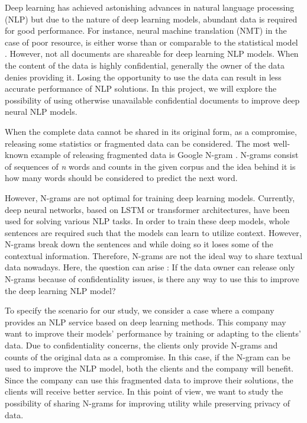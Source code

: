 

Deep learning has achieved astonishing advances in natural language processing (NLP) but due to the nature of deep learning models, abundant data is required for good performance. For instance, neural machine translation (NMT) in the case of poor resource, is either worse than or comparable to the statistical model \parencite{zoph2016transfer}. However, not all documents are shareable for deep learning NLP models. When the content of the data is highly confidential, generally the owner of the data denies providing it. Losing the opportunity to use the data can result in less accurate performance of NLP solutions. In this project, we will explore the possibility of using otherwise unavailable confidential documents to improve deep neural NLP models.

When the complete data cannot be shared in its original form, as a compromise, releasing some statistics or fragmented data can be considered. The most well-known example of releasing fragmented data is Google N-gram \parencite{michel2011quantitative}. N-grams consist of sequences of \textit{n} words and counts in the given corpus and the idea behind it is how many words should be considered to predict the next word. 

However, N-grams are not optimal for training deep learning models. Currently, deep neural networks, based on LSTM \parencite{bahdanau2014neural} or transformer \parencite{vaswani2017attention} architectures, have been used for solving various NLP tasks. In order to train these deep models, whole sentences are required such that the models can learn to utilize context. However, N-grams break down the sentences and while doing so it loses some of the contextual information. Therefore, N-grams are not the ideal way to share textual data nowadays. Here, the question can arise : If the data owner can release only N-grams because of confidentiality issues, is there any way to use this to improve the deep learning NLP model?

To specify the scenario for our study, we consider a case where a company provides an NLP service based on deep learning methods. This company may want to improve their models' performance by training or adapting to the clients' data. Due to confidentiality concerns, the clients only provide N-grams and counts of the original data as a compromise. In this case, if the N-gram can be used to improve the NLP model, both the clients and the company will benefit. Since the company can use this fragmented data to improve their solutions, the clients will receive better service. In this point of view, we want to study the possibility of sharing N-grams for improving utility while preserving privacy of data.

